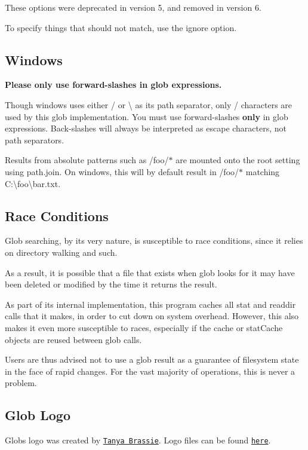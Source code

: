 These options were deprecated in version 5, and removed in version 6.

To specify things that should not match, use the {\ttfamily ignore} option.

\subsection*{Windows}

{\bfseries Please only use forward-\/slashes in glob expressions.}

Though windows uses either {\ttfamily /} or {\ttfamily \textbackslash{}} as its path separator, only {\ttfamily /} characters are used by this glob implementation. You must use forward-\/slashes {\bfseries only} in glob expressions. Back-\/slashes will always be interpreted as escape characters, not path separators.

Results from absolute patterns such as {\ttfamily /foo/$\ast$} are mounted onto the root setting using {\ttfamily path.\+join}. On windows, this will by default result in {\ttfamily /foo/$\ast$} matching {\ttfamily C\+:\textbackslash{}foo\textbackslash{}bar.\+txt}.

\subsection*{Race Conditions}

Glob searching, by its very nature, is susceptible to race conditions, since it relies on directory walking and such.

As a result, it is possible that a file that exists when glob looks for it may have been deleted or modified by the time it returns the result.

As part of its internal implementation, this program caches all stat and readdir calls that it makes, in order to cut down on system overhead. However, this also makes it even more susceptible to races, especially if the cache or stat\+Cache objects are reused between glob calls.

Users are thus advised not to use a glob result as a guarantee of filesystem state in the face of rapid changes. For the vast majority of operations, this is never a problem.

\subsection*{Glob Logo}

Glob\textquotesingle{}s logo was created by \href{http://tanyabrassie.com/}{\tt Tanya Brassie}. Logo files can be found \href{https://github.com/isaacs/node-glob/tree/master/logo}{\tt here}.

